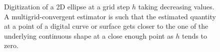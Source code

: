 \begin{figure}[htbp]
  \centering
  \hspace{0.05\textwidth}
  \hspace{0.05\textwidth}
  \caption{Digitization of a 2D ellipse at a grid step $h$ taking decreasing values.
    A multigrid-convergent estimator is such that the estimated quantity at a point of a
    digital curve or surface gets closer to the one of the underlying continuous shape
    at a close enough point as $h$ tends to zero.
  }
  \label{fig:multi}
\end{figure}






